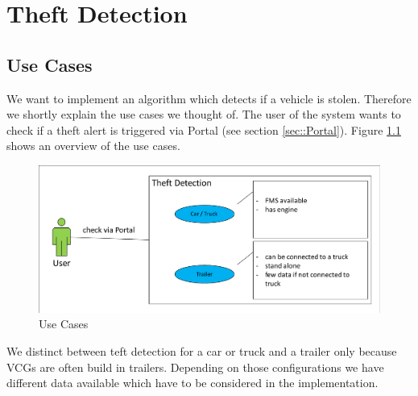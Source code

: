 \chapter{Theft Detection}

\section{Use Cases}

We want to implement an algorithm which detects if a vehicle is stolen. Therefore we shortly explain the use cases we thought of. The user of the system wants to check if a theft alert is triggered via Portal (see section \ref{sec::Portal}). 
Figure \ref{fig::useCase} shows an overview of the use cases.

\begin{figure} [h]
    \includegraphics[clip, trim=0.1cm 0.1cm 0.1cm 0.1cm, width=1\textwidth]{src/pic/UseCase}
    \caption{Use Cases}
    \label{fig::useCase}
\end{figure}

We distinct between teft detection for a car or truck and a trailer only because VCGs are often build in trailers. Depending on those configurations we have different data available which have to be considered in the implementation.


